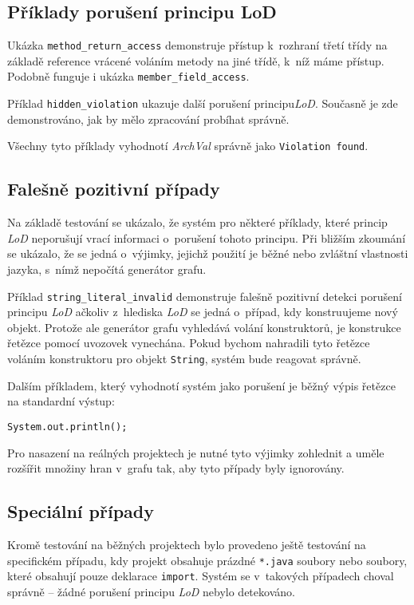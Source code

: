 \subsection{Příklady porušení principu LoD}

Ukázka \verb+method_return_access+ demonstruje přístup k~rozhraní třetí třídy na základě reference vrácené voláním metody na jiné třídě, k~níž máme přístup. Podobně funguje i ukázka \verb+member_field_access+.

Příklad \verb+hidden_violation+ ukazuje další porušení principu\emph{LoD}. Současně je zde demonstrováno, jak by mělo zpracování probíhat správně.

Všechny tyto příklady vyhodnotí \emph{ArchVal} správně jako \verb+Violation found+.

\subsection{Falešně pozitivní případy}

Na základě testování se ukázalo, že systém pro některé příklady, které princip \emph{LoD} neporušují vrací informaci o~porušení tohoto principu. Při bližším zkoumání se ukázalo, že se jedná o~výjimky, jejichž použití je běžné nebo zvláštní vlastnosti jazyka, s~nímž nepočítá generátor grafu.

Příklad \verb+string_literal_invalid+ demonstruje falešně pozitivní detekci porušení principu \emph{LoD} ačkoliv z~hlediska \emph{LoD} se jedná o~případ, kdy konstruujeme nový objekt. Protože ale generátor grafu vyhledává volání konstruktorů, je konstrukce řetězce pomocí uvozovek vynechána. Pokud bychom nahradili tyto řetězce voláním konstruktoru pro objekt \verb+String+, systém bude reagovat správně.

Dalším příkladem, který vyhodnotí systém jako porušení je běžný výpis řetězce na standardní výstup:

\begin{verbatim}
System.out.println();
\end{verbatim}

Pro nasazení na reálných projektech je nutné tyto výjimky zohlednit a uměle rozšířit množiny hran v~grafu tak, aby tyto případy byly ignorovány.

\subsection{Speciální případy}

Kromě testování na běžných projektech bylo provedeno ještě testování na specifickém případu, kdy projekt obsahuje prázdné \verb+*.java+ soubory nebo soubory, které obsahují pouze deklarace \verb+import+. Systém se v~takových případech choval správně -- žádné porušení principu \emph{LoD} nebylo detekováno.
